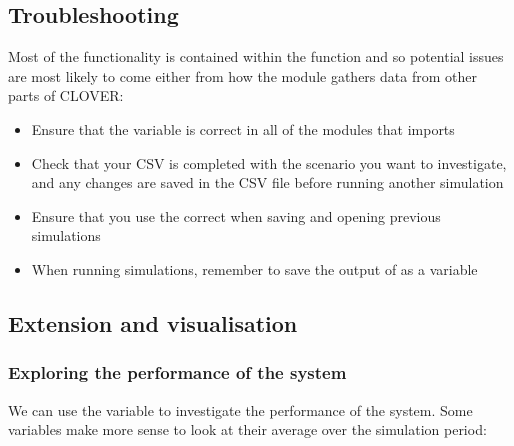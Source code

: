 \documentclass[letterpaper,10pt,english]{sphinxmanual}
\begin{document}
\subsection{Troubleshooting}
\label{\detokenize{energy_system_simulation:troubleshooting}}
\sphinxAtStartPar
Most of the  functionality is contained within the
 function and so potential issues are
most likely to come either from how the module gathers data from other
parts of CLOVER:
\begin{itemize}
\item {} 
\sphinxAtStartPar
Ensure that the  variable is correct in all of the modules that  imports

\item {} 
\sphinxAtStartPar
Check that your  CSV is completed with the scenario you want to investigate, and any changes are saved in the CSV file before running another simulation

\item {} 
\sphinxAtStartPar
Ensure that you use the correct  when saving and opening previous simulations

\item {} 
\sphinxAtStartPar
When running simulations, remember to save the output of  as a variable

\end{itemize}


\subsection{Extension and visualisation}
\label{\detokenize{energy_system_simulation:extension-and-visualisation}}

\subsubsection{Exploring the performance of the system}
\label{\detokenize{energy_system_simulation:exploring-the-performance-of-the-system}}
\sphinxAtStartPar
We can use the  variable to
investigate the performance of the system. Some variables make more
sense to look at their average over the simulation period:
\end{document}

